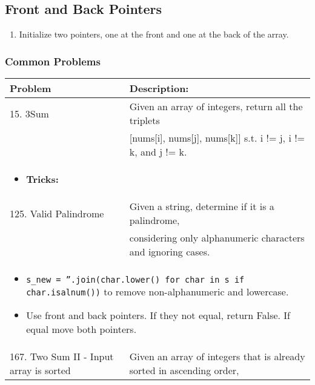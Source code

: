 \subsection{Front and Back Pointers}
\begin{algo}
    \begin{enumerate}
        \item Initialize two pointers, one at the front and one at the back of the array.
    \end{enumerate}
\end{algo}

\subsubsection{Common Problems}
\begin{summary}
    \begin{center}
        \begin{tabular}{ll}
            \toprule
            \textbf{Problem} & \textbf{Description:} \\
            \midrule
            15. 3Sum & Given an array of integers, return all the triplets \\
            & [nums[i], nums[j], nums[k]] s.t. i != j, i != k, and j != k. \\
            \multicolumn{2}{p{\linewidth}}{
                \begin{itemize}
                    \item \textbf{Tricks:}
                \end{itemize}
            } \\
            \midrule
            125. Valid Palindrome & Given a string, determine if it is a palindrome, \\
            & considering only alphanumeric characters and ignoring cases. \\
            \multicolumn{2}{p{\linewidth}}{
                \begin{itemize}
                    \item \texttt{s\_new = ''.join(char.lower() for char in s if char.isalnum())} to remove non-alphanumeric and lowercase. 
                    \item Use front and back pointers. If they not equal, return False. If equal move both pointers.
                \end{itemize}
            } \\
            \midrule
            167. Two Sum II - Input array is sorted & Given an array of integers that is already sorted in ascending order, \\

\end{tabular}
\end{center}
\end{summary}
